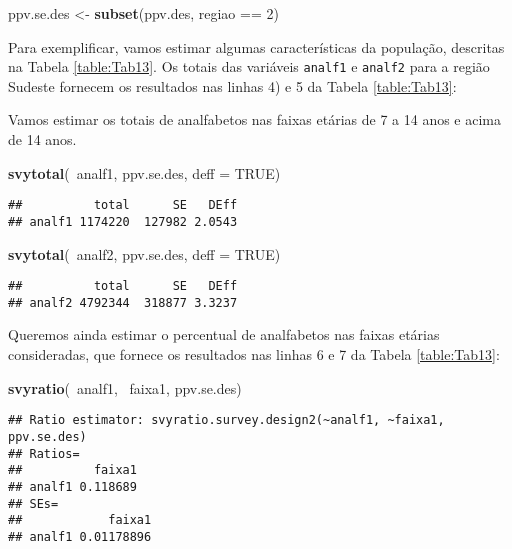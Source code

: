 \documentclass[]{book}
\newenvironment{Shaded}{\begin{snugshade}}{\end{snugshade}}
\newcommand{\KeywordTok}[1]{\textcolor[rgb]{0.13,0.29,0.53}{\textbf{{#1}}}}
\newcommand{\DataTypeTok}[1]{\textcolor[rgb]{0.13,0.29,0.53}{{#1}}}
\newcommand{\DecValTok}[1]{\textcolor[rgb]{0.00,0.00,0.81}{{#1}}}
\newcommand{\StringTok}[1]{\textcolor[rgb]{0.31,0.60,0.02}{{#1}}}
\newcommand{\OtherTok}[1]{\textcolor[rgb]{0.56,0.35,0.01}{{#1}}}
\newcommand{\NormalTok}[1]{{#1}}
\numberwithin{example}{chapter}
\numberwithin{remark}{chapter}
\numberwithin{definition}{chapter}
\begin{document}
\begin{Shaded}
\begin{Highlighting}[]
\NormalTok{ppv.se.des <-}\StringTok{ }\KeywordTok{subset}\NormalTok{(ppv.des, regiao ==}\StringTok{ }\DecValTok{2}\NormalTok{)}
\end{Highlighting}
\end{Shaded}

Para exemplificar, vamos estimar algumas características da população,
descritas na Tabela \ref{table:Tab13}. Os totais das variáveis
\texttt{analf1} e \texttt{analf2} para a região Sudeste fornecem os
resultados nas linhas 4) e 5 da Tabela \ref{table:Tab13}:

Vamos estimar os totais de analfabetos nas faixas etárias de 7 a 14 anos
e acima de 14 anos.

\begin{Shaded}
\begin{Highlighting}[]
\KeywordTok{svytotal}\NormalTok{(~analf1, ppv.se.des, }\DataTypeTok{deff =} \OtherTok{TRUE}\NormalTok{)}
\end{Highlighting}
\end{Shaded}

\begin{verbatim}
##          total      SE   DEff
## analf1 1174220  127982 2.0543
\end{verbatim}

\begin{Shaded}
\begin{Highlighting}[]
\KeywordTok{svytotal}\NormalTok{(~analf2, ppv.se.des, }\DataTypeTok{deff =} \OtherTok{TRUE}\NormalTok{)}
\end{Highlighting}
\end{Shaded}

\begin{verbatim}
##          total      SE   DEff
## analf2 4792344  318877 3.3237
\end{verbatim}

Queremos ainda estimar o percentual de analfabetos nas faixas etárias
consideradas, que fornece os resultados nas linhas 6 e 7 da Tabela
\ref{table:Tab13}:

\begin{Shaded}
\begin{Highlighting}[]
\KeywordTok{svyratio}\NormalTok{(~analf1, ~faixa1, ppv.se.des)}
\end{Highlighting}
\end{Shaded}

\begin{verbatim}
## Ratio estimator: svyratio.survey.design2(~analf1, ~faixa1, ppv.se.des)
## Ratios=
##          faixa1
## analf1 0.118689
## SEs=
##            faixa1
## analf1 0.01178896
\end{verbatim}
\end{document}
